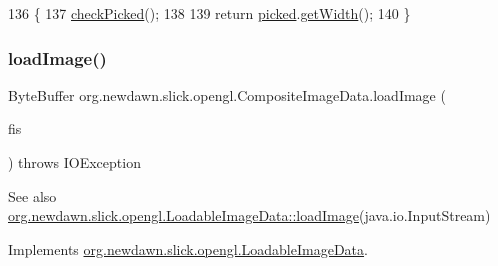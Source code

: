 \begin{DoxyCode}
136                           \{
137         \mbox{\hyperlink{classorg_1_1newdawn_1_1slick_1_1opengl_1_1_composite_image_data_a1a95487f3cd09ae6bf1458ffa1d433b8}{checkPicked}}();
138         
139         \textcolor{keywordflow}{return} \mbox{\hyperlink{classorg_1_1newdawn_1_1slick_1_1opengl_1_1_composite_image_data_a7238cbb20cc08b68a29935b4bc222da7}{picked}}.\mbox{\hyperlink{interfaceorg_1_1newdawn_1_1slick_1_1opengl_1_1_image_data_a59fd53f0ca1e501de35c1b2b4a7e69c5}{getWidth}}();
140     \}
\end{DoxyCode}
\mbox{\label{classorg_1_1newdawn_1_1slick_1_1opengl_1_1_composite_image_data_afac01aa86b627c3e172aeb7e66ec2b2f}} 
\subsubsection{\texorpdfstring{load\+Image()}{loadImage()}\hspace{0.1cm}{\footnotesize\ttfamily [1/3]}}
{\footnotesize\ttfamily Byte\+Buffer org.\+newdawn.\+slick.\+opengl.\+Composite\+Image\+Data.\+load\+Image (\begin{DoxyParamCaption}\item[{Input\+Stream}]{fis }\end{DoxyParamCaption}) throws I\+O\+Exception\hspace{0.3cm}{\ttfamily [inline]}}

\begin{DoxySeeAlso}{See also}
\mbox{\hyperlink{interfaceorg_1_1newdawn_1_1slick_1_1opengl_1_1_loadable_image_data_a640021b955dde7deeeeabb5ac3738d2b}{org.\+newdawn.\+slick.\+opengl.\+Loadable\+Image\+Data\+::load\+Image}}(java.\+io.\+Input\+Stream) 
\end{DoxySeeAlso}


Implements \mbox{\hyperlink{interfaceorg_1_1newdawn_1_1slick_1_1opengl_1_1_loadable_image_data_a640021b955dde7deeeeabb5ac3738d2b}{org.\+newdawn.\+slick.\+opengl.\+Loadable\+Image\+Data}}.


